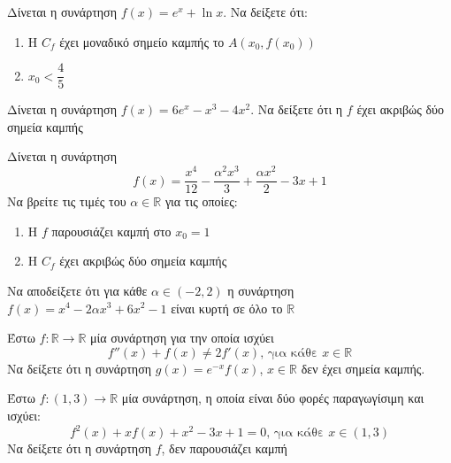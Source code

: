 \documentclass{../presentation}
\begin{document}
\begin{askisi}
  Δίνεται η συνάρτηση $f(x)=e^x+\ln x$. Να δείξετε ότι:
  \begin{enumerate}
    \item<1-> Η $C_f$ έχει μοναδικό σημείο καμπής το $Α(x_0,f(x_0))$
    \item<2-> $x_0<\dfrac{4}{5}$
  \end{enumerate}

\end{askisi}

\begin{askisi}
  Δίνεται η συνάρτηση $f(x)=6e^x-x^3-4x^2$. Να δείξετε ότι η $f$ έχει ακριβώς δύο σημεία καμπής

\end{askisi}

\begin{askisi}
  Δίνεται η συνάρτηση $$f(x)=\dfrac{x^4}{12}-\dfrac{α^2x^3}{3}+\dfrac{αx^2}{2}-3x+1$$
  Να βρείτε τις τιμές του $α\in\mathbb{R}$ για τις οποίες:
  \begin{enumerate}
    \item<1-> Η $f$ παρουσιάζει καμπή στο $x_0=1$
    \item<2-> Η $C_f$ έχει ακριβώς δύο σημεία καμπής
  \end{enumerate}

\end{askisi}

\begin{askisi}
  Να αποδείξετε ότι για κάθε $α\in (-2,2)$ η συνάρτηση $f(x)=x^4-2αx^3+6x^2-1$ είναι κυρτή σε όλο το $\mathbb{R}$

\end{askisi}

\begin{askisi}
  Έστω $f:\mathbb{R}\to\mathbb{R}$ μία συνάρτηση για την οποία ισχύει
  $$f''(x)+f(x)\ne 2f'(x)\text{, για κάθε } x\in\mathbb{R}$$
  Να δείξετε ότι η συνάρτηση $g(x)=e^{-x}f(x)$, $x\in\mathbb{R}$ δεν έχει σημεία καμπής.

\end{askisi}

\begin{askisi}

  Έστω $f:(1,3)\to\mathbb{R}$ μία συνάρτηση, η οποία είναι δύο φορές παραγωγίσιμη και ισχύει:
  $$f^2(x)+xf(x)+x^2-3x+1=0\text{, για κάθε } x\in (1,3)$$
  Να δείξετε ότι η συνάρτηση $f$, δεν παρουσιάζει καμπή

\end{askisi}
\end{document}
